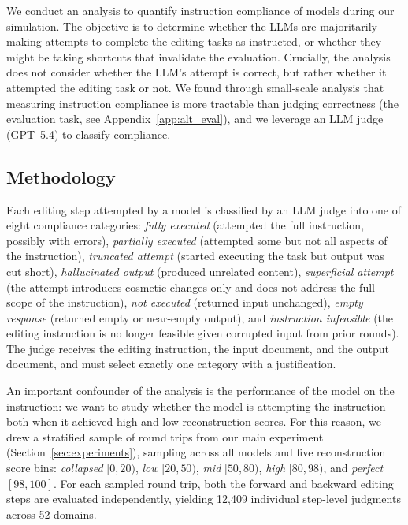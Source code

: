 \documentclass{article} %
\begin{document}
We conduct an analysis to quantify instruction compliance of models during our simulation. The objective is to determine whether the LLMs are majoritarily making attempts to complete the editing tasks as instructed, or whether they might be taking shortcuts that invalidate the evaluation. Crucially, the analysis does not consider whether the LLM's attempt is correct, but rather whether it attempted the editing task or not. We found through small-scale analysis that measuring instruction compliance is more tractable than judging correctness (the evaluation task, see Appendix~\ref{app:alt_eval}), and we leverage an LLM judge (GPT~5.4) to classify compliance.

\subsection{Methodology}

Each editing step attempted by a model is classified by an LLM judge into one of eight compliance categories: \textit{fully executed} (attempted the full instruction, possibly with errors), \textit{partially executed} (attempted some but not all aspects of the instruction), \textit{truncated attempt} (started executing the task but output was cut short), \textit{hallucinated output} (produced unrelated content), \textit{superficial attempt} (the attempt introduces cosmetic changes only and does not address the full scope of the instruction), \textit{not executed} (returned input unchanged), \textit{empty response} (returned empty or near-empty output), and \textit{instruction infeasible} (the editing instruction is no longer feasible given corrupted input from prior rounds). The judge receives the editing instruction, the input document, and the output document, and must select exactly one category with a justification.

An important confounder of the analysis is the performance of the model on the instruction: we want to study whether the model is attempting the instruction both when it achieved high and low reconstruction scores. For this reason, we drew a stratified sample of round trips from our main experiment (Section~\ref{sec:experiments}), sampling across all models and five reconstruction score bins: \textit{collapsed} $[0, 20)$, \textit{low} $[20, 50)$, \textit{mid} $[50, 80)$, \textit{high} $[80, 98)$, and \textit{perfect} $[98, 100]$. For each sampled round trip, both the forward and backward editing steps are evaluated independently, yielding 12{,}409 individual step-level judgments across 52 domains.
\end{document}
